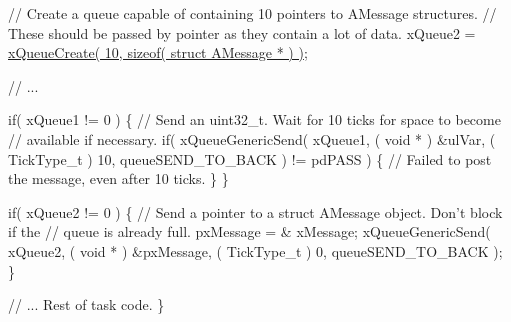 \begin{DoxyPre}   // Create a queue capable of containing 10 pointers to AMessage structures.
   // These should be passed by pointer as they contain a lot of data.
   xQueue2 = \hyperlink{queue_8h_aeb858b824bd74a934ea7ebb81af2a6bb}{xQueueCreate( 10, sizeof( struct AMessage * ) )};\end{DoxyPre}



\begin{DoxyPre}   // ...\end{DoxyPre}



\begin{DoxyPre}   if( xQueue1 != 0 )
   \{
    // Send an uint32\_t.  Wait for 10 ticks for space to become
    // available if necessary.
    if( xQueueGenericSend( xQueue1, ( void * ) \&ulVar, ( TickType\_t ) 10, queueSEND\_TO\_BACK ) != pdPASS )
    \{
        // Failed to post the message, even after 10 ticks.
    \}
   \}\end{DoxyPre}



\begin{DoxyPre}   if( xQueue2 != 0 )
   \{
    // Send a pointer to a struct AMessage object.  Don't block if the
    // queue is already full.
    pxMessage = \& xMessage;
    xQueueGenericSend( xQueue2, ( void * ) \&pxMessage, ( TickType\_t ) 0, queueSEND\_TO\_BACK );
   \}\end{DoxyPre}



\begin{DoxyPre}   // ... Rest of task code.
\}
\end{DoxyPre}
 